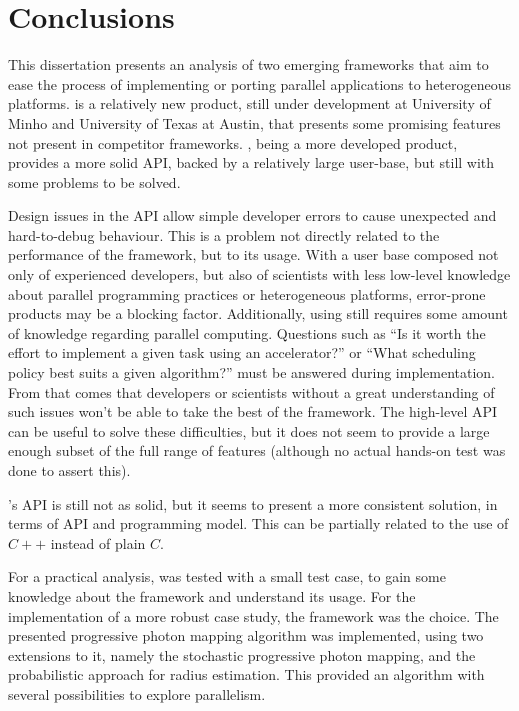 \documentclass[main.tex]{subfiles}
\begin{document}
\chapter{Conclusions} \label{chapter:conclusions}

This dissertation presents an analysis of two emerging frameworks that aim to ease the process of implementing or porting parallel applications to heterogeneous platforms. \gama is a relatively new product, still under development at University of Minho and University of Texas at Austin, that presents some promising features not present in competitor frameworks. \starpu, being a more developed product, provides a more solid API, backed by a relatively large user-base, but still with some problems to be solved.

Design issues in the \starpu API allow simple developer errors to cause unexpected and hard-to-debug behaviour. This is a problem not directly related to the performance of the framework, but to its usage. With a user base composed not only of experienced developers, but also of scientists with less low-level knowledge about parallel programming practices or heterogeneous platforms, error-prone products may be a blocking factor. Additionally, using \starpu still requires some amount of knowledge regarding parallel computing. Questions such as ``Is it worth the effort to implement a given task using an accelerator?'' or ``What scheduling policy best suits a given algorithm?'' must be answered during implementation. From that comes that developers or scientists without a great understanding of such issues won't be able to take the best of the framework.
The high-level \starpu API can be useful to solve these difficulties, but it does not seem to provide a large enough subset of the full range of \starpu features (although no actual hands-on test was done to assert this).

\gama's API is still not as solid, but it seems to present a more consistent solution, in terms of API and programming model. This can be partially related to the use of $C++$ instead of plain $C$.


For a practical analysis, \gama was tested with a small test case, to gain some knowledge about the framework and understand its usage. For the implementation of a more robust case study, the \starpu framework was the choice. The presented progressive photon mapping algorithm was implemented, using two extensions to it, namely the stochastic progressive photon mapping, and the probabilistic approach for radius estimation. This provided an algorithm with several possibilities to explore parallelism.
\end{document}
